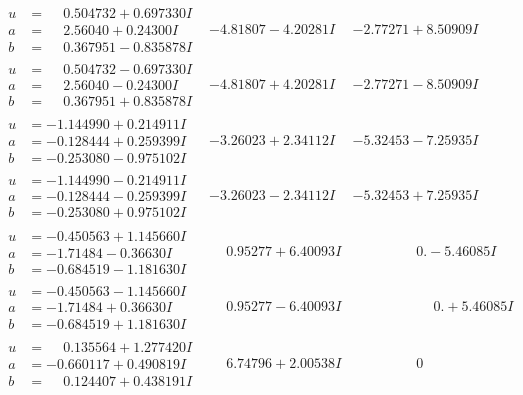 \documentclass[1p]{elsarticle_modified}
\theoremstyle{definition}
\begin{document}
$$\begin{array}{c|c|c}
\begin{aligned}
u &= \phantom{-}0.504732 + 0.697330 I \\
a &= \phantom{-}2.56040 + 0.24300 I \\
b &= \phantom{-}0.367951 - 0.835878 I\end{aligned}
 & -4.81807 - 4.20281 I & -2.77271 + 8.50909 I \\ \hline\begin{aligned}
u &= \phantom{-}0.504732 - 0.697330 I \\
a &= \phantom{-}2.56040 - 0.24300 I \\
b &= \phantom{-}0.367951 + 0.835878 I\end{aligned}
 & -4.81807 + 4.20281 I & -2.77271 - 8.50909 I \\ \hline\begin{aligned}
u &= -1.144990 + 0.214911 I \\
a &= -0.128444 + 0.259399 I \\
b &= -0.253080 - 0.975102 I\end{aligned}
 & -3.26023 + 2.34112 I & -5.32453 - 7.25935 I \\ \hline\begin{aligned}
u &= -1.144990 - 0.214911 I \\
a &= -0.128444 - 0.259399 I \\
b &= -0.253080 + 0.975102 I\end{aligned}
 & -3.26023 - 2.34112 I & -5.32453 + 7.25935 I \\ \hline\begin{aligned}
u &= -0.450563 + 1.145660 I \\
a &= -1.71484 - 0.36630 I \\
b &= -0.684519 - 1.181630 I\end{aligned}
 & \phantom{-}0.95277 + 6.40093 I & \phantom{-0.000000 } 0. - 5.46085 I \\ \hline\begin{aligned}
u &= -0.450563 - 1.145660 I \\
a &= -1.71484 + 0.36630 I \\
b &= -0.684519 + 1.181630 I\end{aligned}
 & \phantom{-}0.95277 - 6.40093 I & \phantom{-0.000000 -}0. + 5.46085 I \\ \hline\begin{aligned}
u &= \phantom{-}0.135564 + 1.277420 I \\
a &= -0.660117 + 0.490819 I \\
b &= \phantom{-}0.124407 + 0.438191 I\end{aligned}
 & \phantom{-}6.74796 + 2.00538 I & \phantom{-0.000000 } 0 \\ \hline\begin{aligned}

\end{aligned}
\end{array}$$
\end{document}

